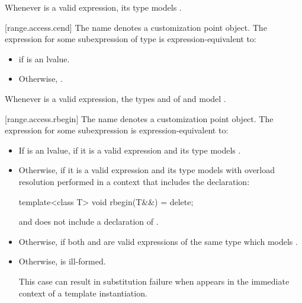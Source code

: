 \pnum
\begin{note}
Whenever  is a valid expression, its type models
.
\end{note}

[range.access.cend]{}
\pnum
The name  denotes a customization point
object. The expression
 for some subexpression  of type 
is expression-equivalent to:
\begin{itemize}
\item {} if  is an lvalue.
\item Otherwise, .
\end{itemize}

\pnum
\begin{note}
Whenever  is a valid expression,
the types  and  of
 and 
model .
\end{note}

[range.access.rbegin]{}
\pnum
The name  denotes a customization point
object. The expression
 for some subexpression  is
expression-equivalent to:
\begin{itemize}
\item
  If  is an lvalue, 
  if it is a valid expression and its type  models
  .

\item
  Otherwise,  if it is a valid
  expression and its type  models
   with overload
  resolution performed in a context that includes the declaration:
  \begin{codeblock}
template<class T> void rbegin(T&&) = delete;
  \end{codeblock}
  and does not include a declaration of .

\item
  Otherwise,  if both
   and  are valid
  expressions of the same type  which models
  .

\item
  Otherwise,  is ill-formed.
  \begin{note}
  This case can result in substitution failure when 
  appears in the immediate context of a template instantiation.
  \end{note}
\end{itemize}

